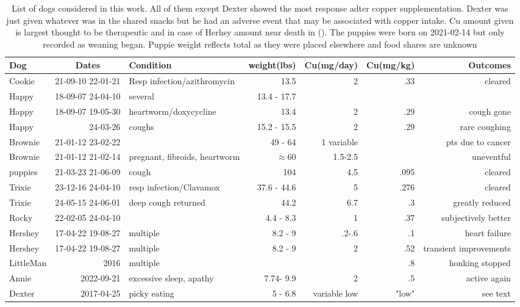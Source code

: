 {

\begin{table}[H] \centering
\begin{tabular}{|l|r|l|r|r|r|r|}
\hline
Dog & \multicolumn{1}{|c|}{Dates} & Condition & weight(lbs) & Cu(mg/day)&Cu(mg/kg)& Outcomes \\
\hline
Cookie &21-09-10 22-01-21&Resp infection/azithromycin &13.5&2&.33&cleared \\
Happy  &18-09-07 24-04-10&several&13.4 - 17.7&&& \\
Happy  &18-09-07 19-05-30&heartworm/doxycycline&13.4 &2&.29&cough gone \\
Happy  &24-03-26 &coughs&15.2 - 15.5&2&.29&rare coughing \\
Brownie  & 21-01-12 23-02-22& &49 - 64&1 variable&& pts due to cancer  \\
Brownie  & 21-01-12 21-02-14&pregnant, fibroids, heartworm & $\approx 60$ &1.5-2.5&& uneventful  \\
puppies  &21-03-23 21-06-09&cough&104&4.5&.095&cleared \\
Trixie  &23-12-16 24-04-10&resp infection/Clavamox&37.6 - 44.6&5&.276&cleared \\
Trixie  &24-05-15 24-06-01&deep cough returned & 44.2 &6.7& .3  & greatly reduced  \\
Rocky  &22-02-05 24-04-10&&4.4 - 8.3 &1&.37&subjectively better  \\
Hershey  &17-04-22 19-08-27&multiple&8.2 -  9 &.2-.6&.1& heart failure  \\
Hershey  &17-04-22 19-08-27&multiple&8.2 - 9 &2&.52& transient improvements  \\
LittleMan  &2016&multiple& &&.8 & honking stopped  \\
Annie  &2022-09-21 &excessive sleep, apathy &7.74- 9.9  &2 & .5 & active again  \\
Dexter  &2017-04-25 &picky eating  &5 - 6.8  & variable low  & "low"   & see text   \\
\hline
\hline
\end{tabular}
\caption{List of dogs considered in this work. All  of them except 
Dexter  showed the most response adter  copper supplementation.
Dexter was just given whatever was in the shared snacks but
he had an adverse event that may be associated with copper intake. 
Cu amount given is largest thought to be therapeutic and in case
of Herhsy amount near death in ().
 The puppies were born on 2021-02-14 but only recorded as weaning began. Puppie weight reflects total as they were placed elsewhere and food shares are unknown   }
\label{tab:dogs}
\end{table}

} %
